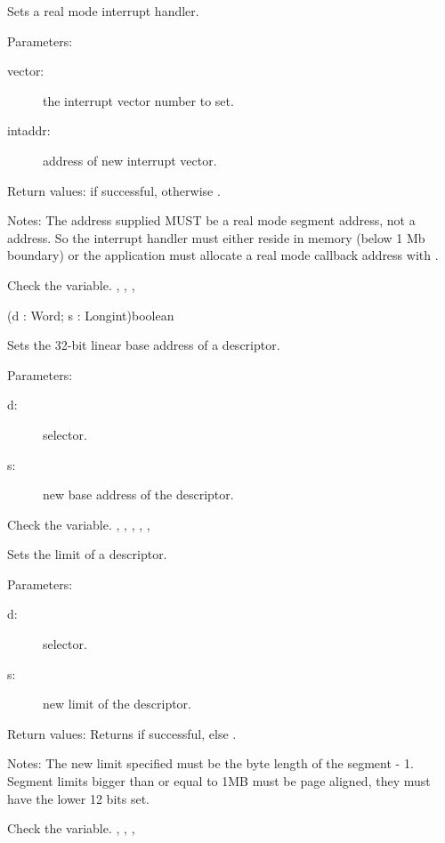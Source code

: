 \html{}

{Sets a real mode interrupt handler.

Parameters:
\begin{description}
\item[vector:\ ] the interrupt vector number to set.
\item[intaddr:\ ] address of new interrupt vector.
\end{description}

Return values:  if successful, otherwise .

Notes: The address supplied MUST be a real mode segment address, not a
 address. So the interrupt handler must either reside in \dos
memory (below 1 Mb boundary) or the application must allocate a real mode
callback address with .
}
{ Check the  variable.}
{ 
, 
, , 
 }

{(d : Word; s : Longint)}{boolean}
{Sets the 32-bit linear base address of a descriptor.

Parameters: 
\begin{description}
\item[d:\ ] selector.
\item[s:\ ] new base address of the descriptor.
\end{description}
}
{ Check the  variable.}
{
,
, 
, 
,
,
}

{Sets the limit of a descriptor.

Parameters: 
\begin{description}
\item[d:\ ] selector.
\item[s:\ ] new limit of the descriptor.
\end{description}

Return values: Returns  if successful, else .

Notes: The new limit specified must be the byte length of the segment - 1.
Segment limits bigger than or equal to 1MB must be page aligned, they must
have the lower 12 bits set.
}
{ Check the  variable.} 
{,
,
, 
}

